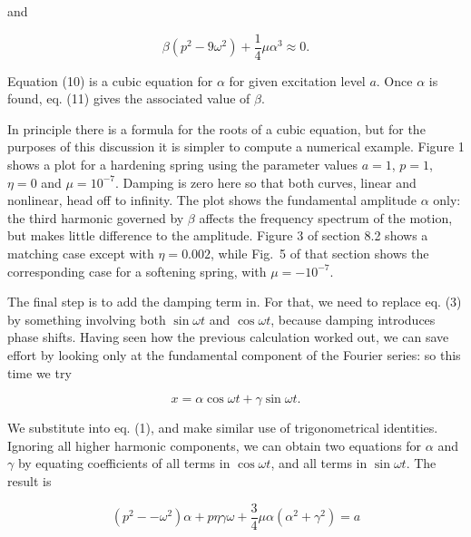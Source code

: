   \noindent{}and 

  \begin{equation*}\beta (p^2-9 \omega^2) + \dfrac{1}{4} \mu \alpha^3 \approx 0 
  . \tag{11}\end{equation*} 

  Equation (10) is a cubic equation for $\alpha$ for given excitation level 
  $a$. Once $\alpha$ is found, eq. (11) gives the associated value of $\beta$. 

  In principle there is a formula for the roots of a cubic equation, but for 
  the purposes of this discussion it is simpler to compute a numerical example. 
  Figure 1 shows a plot for a hardening spring using the parameter values 
  $a=1$, $p=1$, $\eta =0$ and $\mu = 10^{-7}$. Damping is zero here so that 
  both curves, linear and nonlinear, head off to infinity. The plot shows the 
  fundamental amplitude $\alpha$ only: the third harmonic governed by $\beta$ 
  affects the frequency spectrum of the motion, but makes little difference to 
  the amplitude. Figure 3 of section 8.2 shows a matching case except with 
  $\eta = 0.002$, while Fig.\ 5 of that section shows the corresponding case 
  for a softening spring, with $\mu = -10^{-7}$. 


  The final step is to add the damping term in. For that, we need to replace 
  eq. (3) by something involving both $\sin \omega t$ and $\cos \omega t$, 
  because damping introduces phase shifts. Having seen how the previous 
  calculation worked out, we can save effort by looking only at the fundamental 
  component of the Fourier series: so this time we try 

  \begin{equation*}x=\alpha \cos \omega t + \gamma \sin \omega t . 
  \tag{12}\end{equation*} 

  We substitute into eq. (1), and make similar use of trigonometrical 
  identities. Ignoring all higher harmonic components, we can obtain two 
  equations for $\alpha$ and $\gamma$ by equating coefficients of all terms in 
  $\cos \omega t$, and all terms in $\sin \omega t$. The result is 

  \begin{equation*}(p^2 -- \omega^2) \alpha +p \eta \gamma \omega +\frac{3}{4} 
  \mu \alpha (\alpha^2 + \gamma^2) = a \tag{13}\end{equation*} 


